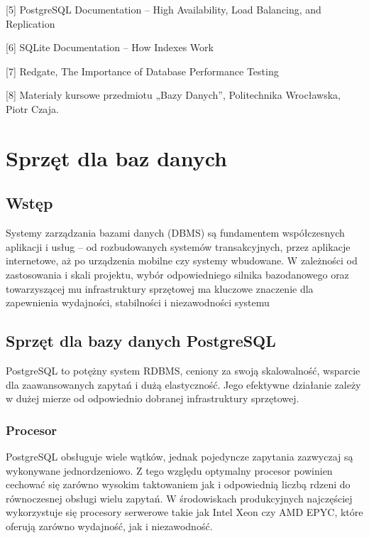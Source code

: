 \documentclass[a4paper,11pt,polish]{sphinxmanual}
\begin{document}
\sphinxAtStartPar
{[}5{]} PostgreSQL Documentation – High Availability, Load Balancing, and Replication

\sphinxAtStartPar
{[}6{]} SQLite Documentation – How Indexes Work

\sphinxAtStartPar
{[}7{]} Redgate, The Importance of Database Performance Testing

\sphinxAtStartPar
{[}8{]} Materiały kursowe przedmiotu „Bazy Danych”, Politechnika Wrocławska, Piotr Czaja.

\sphinxstepscope


\chapter{Sprzęt dla baz danych}
\label{\detokenize{Sprzet-dla-bazy-danych/source/SprzetDlaBazyDanych:sprzet-dla-baz-danych}}\label{\detokenize{Sprzet-dla-bazy-danych/source/SprzetDlaBazyDanych::doc}}

\section{Wstęp}
\label{\detokenize{Sprzet-dla-bazy-danych/source/SprzetDlaBazyDanych:wstep}}
\sphinxAtStartPar
Systemy zarządzania bazami danych (DBMS) są fundamentem współczesnych aplikacji i usług – od rozbudowanych systemów transakcyjnych, przez aplikacje internetowe, aż po urządzenia mobilne czy systemy wbudowane. W zależności od zastosowania i skali projektu, wybór odpowiedniego silnika bazodanowego oraz towarzyszącej mu infrastruktury sprzętowej ma kluczowe znaczenie dla zapewnienia wydajności, stabilności i niezawodności systemu


\section{Sprzęt dla bazy danych PostgreSQL}
\label{\detokenize{Sprzet-dla-bazy-danych/source/SprzetDlaBazyDanych:sprzet-dla-bazy-danych-postgresql}}
\sphinxAtStartPar
PostgreSQL to potężny system RDBMS, ceniony za swoją skalowalność, wsparcie dla zaawansowanych zapytań i dużą elastyczność. Jego efektywne działanie zależy w dużej mierze od odpowiednio dobranej infrastruktury sprzętowej.


\subsection{Procesor}
\label{\detokenize{Sprzet-dla-bazy-danych/source/SprzetDlaBazyDanych:procesor}}
\sphinxAtStartPar
PostgreSQL obsługuje wiele wątków, jednak pojedyncze zapytania zazwyczaj są wykonywane jednordzeniowo. Z tego względu optymalny procesor powinien cechować się zarówno wysokim taktowaniem jak i odpowiednią liczbą rdzeni do równoczesnej obsługi wielu zapytań. W środowiskach produkcyjnych najczęściej wykorzystuje się procesory serwerowe takie jak Intel Xeon czy AMD EPYC, które oferują zarówno wydajność, jak i niezawodność.
\end{document}
